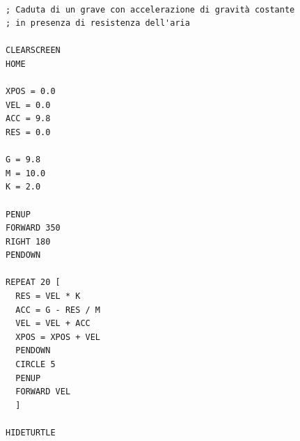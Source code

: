 \vskip 1cm

\lstset{extendedchars=true, numbers=left,basicstyle=\scriptsize} 
\begin{lstlisting}[frame=single]  % Start your code-block

; Caduta di un grave con accelerazione di gravità costante
; in presenza di resistenza dell'aria

CLEARSCREEN
HOME

XPOS = 0.0
VEL = 0.0
ACC = 9.8
RES = 0.0

G = 9.8
M = 10.0
K = 2.0

PENUP
FORWARD 350
RIGHT 180
PENDOWN

REPEAT 20 [
  RES = VEL * K
  ACC = G - RES / M
  VEL = VEL + ACC
  XPOS = XPOS + VEL
  PENDOWN
  CIRCLE 5
  PENUP
  FORWARD VEL
  ]

HIDETURTLE
\end{lstlisting}

\vskip 1cm

